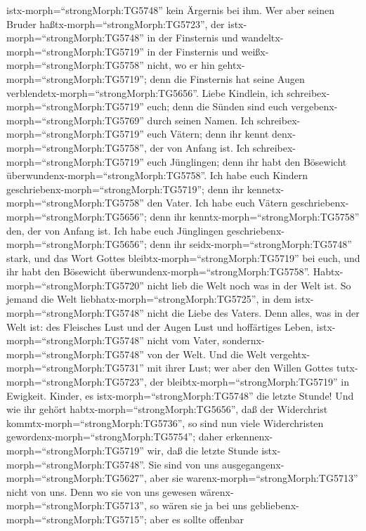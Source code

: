 istx-morph=``strongMorph:TG5748'' kein Ärgernis bei ihm. 
Wer aber seinen Bruder haßtx-morph=``strongMorph:TG5723'', der
istx-morph=``strongMorph:TG5748'' in der Finsternis und
wandeltx-morph=``strongMorph:TG5719'' in der Finsternis und
weißx-morph=``strongMorph:TG5758'' nicht, wo er hin
gehtx-morph=``strongMorph:TG5719''; denn die Finsternis hat seine Augen
verblendetx-morph=``strongMorph:TG5656''.  Liebe Kindlein,
ich schreibex-morph=``strongMorph:TG5719'' euch; denn die Sünden sind
euch vergebenx-morph=``strongMorph:TG5769'' durch seinen Namen.
 Ich schreibex-morph=``strongMorph:TG5719'' euch Vätern;
denn ihr kennt denx-morph=``strongMorph:TG5758'', der von Anfang ist.
Ich schreibex-morph=``strongMorph:TG5719'' euch Jünglingen; denn ihr
habt den Bösewicht überwundenx-morph=``strongMorph:TG5758''.
 Ich habe euch Kindern
geschriebenx-morph=``strongMorph:TG5719''; denn ihr
kennetx-morph=``strongMorph:TG5758'' den Vater. Ich habe euch Vätern
geschriebenx-morph=``strongMorph:TG5656''; denn ihr
kenntx-morph=``strongMorph:TG5758'' den, der von Anfang ist. Ich habe
euch Jünglingen geschriebenx-morph=``strongMorph:TG5656''; denn ihr
seidx-morph=``strongMorph:TG5748'' stark, und das Wort Gottes
bleibtx-morph=``strongMorph:TG5719'' bei euch, und ihr habt den
Bösewicht überwundenx-morph=``strongMorph:TG5758''. 
Habtx-morph=``strongMorph:TG5720'' nicht lieb die Welt noch was in der
Welt ist. So jemand die Welt liebhatx-morph=``strongMorph:TG5725'', in
dem istx-morph=``strongMorph:TG5748'' nicht die Liebe des Vaters.
 Denn alles, was in der Welt ist: des Fleisches Lust und
der Augen Lust und hoffärtiges Leben, istx-morph=``strongMorph:TG5748''
nicht vom Vater, sondernx-morph=``strongMorph:TG5748'' von der Welt.
 Und die Welt vergehtx-morph=``strongMorph:TG5731'' mit
ihrer Lust; wer aber den Willen Gottes
tutx-morph=``strongMorph:TG5723'', der
bleibtx-morph=``strongMorph:TG5719'' in Ewigkeit.  Kinder,
es istx-morph=``strongMorph:TG5748'' die letzte Stunde! Und wie ihr
gehört habtx-morph=``strongMorph:TG5656'', daß der Widerchrist
kommtx-morph=``strongMorph:TG5736'', so sind nun viele Widerchristen
gewordenx-morph=``strongMorph:TG5754''; daher
erkennenx-morph=``strongMorph:TG5719'' wir, daß die letzte Stunde
istx-morph=``strongMorph:TG5748''.  Sie sind von uns
ausgegangenx-morph=``strongMorph:TG5627'', aber sie
warenx-morph=``strongMorph:TG5713'' nicht von uns. Denn wo sie von uns
gewesen wärenx-morph=``strongMorph:TG5713'', so wären sie ja bei uns
gebliebenx-morph=``strongMorph:TG5715''; aber es sollte offenbar
